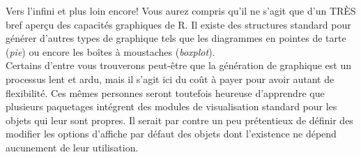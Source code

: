 \begin{moreInfo}{Vers l'infini et plus loin encore!}
	Vous aurez compris qu'il ne s'agit que d'un TRÈS bref aperçu des capacités graphiques de R. Il existe des structures standard pour générer d'autres types de graphique tels que les diagrammes en pointes de tarte (\emph{pie}) ou encore les boîtes à moustaches (\emph{boxplot}). \\
	Certains d'entre vous trouverons peut-être que la génération de graphique est un processus lent et ardu, mais il s'agit ici du coût à payer pour avoir autant de flexibilité. Ces mêmes personnes seront toutefois heureuse d'apprendre que plusieurs paquetages intégrent des modules de visualisation standard pour les objets qui leur sont propres. Il serait par contre un peu prétentieux de définir des modifier les options d'affiche par défaut des objets dont l'existence ne dépend aucunement de leur utilisation.
\end{moreInfo}